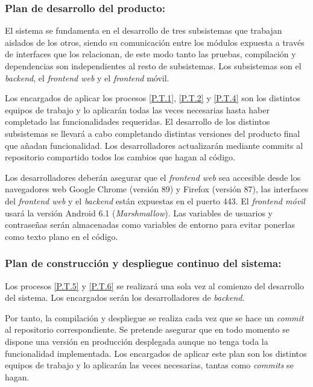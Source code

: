 \documentclass{article}
\begin{document}
\subsubsection{Plan de desarrollo del producto: } \label{PL.T.2}

El sistema se fundamenta en el desarrollo de tres subsistemas que trabajan aislados de los otros, siendo su comunicación entre los módulos expuesta a través de interfaces que los relacionan, de este modo tanto las pruebas, compilación y dependencias son independientes al resto de subsistemas. Los subsistemas son el \textit{backend}, el \textit{frontend web} y el \textit{frontend} móvil. 

Los encargados de aplicar los procesos \ref{P.T.1}, \ref{P.T.2} y \ref{P.T.4} son los distintos equipos de trabajo y lo aplicarán todas las veces necesarias hasta haber completado las funcionalidades requeridas. El desarrollo de los distintos subsistemas se llevará a cabo completando distintas versiones del producto final que añadan funcionalidad. Los desarrolladores actualizarán mediante commits al repositorio compartido todos los cambios que hagan al código.

Los desarrolladores deberán asegurar que el \textit{frontend web} sea accesible desde los navegadores web Google Chrome (versión 89) y Firefox (versión 87), las interfaces del \textit{frontend web} y el \textit{backend} están expuestas en el puerto 443. El \textit{frontend móvil} usará la versión Android 6.1 (\textit{Marshmallow}). Las variables de usuarios y contraseñas serán almacenadas como variables de entorno para evitar ponerlas como texto plano en el código.


\subsubsection{Plan de construcción y despliegue continuo del sistema: } \label{PL.T.3}
Los procesos \ref{P.T.5} y \ref{P.T.6} se realizará una sola vez al comienzo del desarrollo del sistema. Los encargados serán los desarrolladores de \textit{backend}. 

Por tanto, la compilación y despliegue se realiza cada vez que se hace un \textit{commit} al repositorio correspondiente. Se pretende asegurar que en todo momento se dispone una versión en producción desplegada aunque no tenga toda la funcionalidad implementada. Los encargados de aplicar este plan son los distintos equipos de trabajo y lo aplicarán las veces necesarias, tantas como \textit{commits} se hagan.
\end{document}

